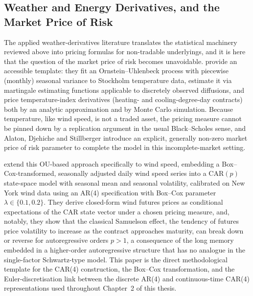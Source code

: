 \documentclass[11pt, a4paper, twoside]{article}
\begin{document}
\subsection{Weather and Energy Derivatives, and the Market Price of Risk}
\label{sec:lit-derivatives}

The applied weather-derivatives literature translates the statistical machinery reviewed above into pricing formulas for non-tradable underlyings, and it is here that the question of the market price of risk becomes unavoidable. \citet{AlatonEtAl2002} provide an accessible template: they fit an Ornstein--Uhlenbeck process with piecewise (monthly) seasonal variance to Stockholm temperature data, estimate it via martingale estimating functions applicable to discretely observed diffusions, and price temperature-index derivatives (heating- and cooling-degree-day contracts) both by an analytic approximation and by Monte Carlo simulation. Because temperature, like wind speed, is not a traded asset, the pricing measure cannot be pinned down by a replication argument in the usual Black--Scholes sense, and Alaton, Djehiche and Stillberger introduce an explicit, generally non-zero market price of risk parameter to complete the model in this incomplete-market setting.

\citet{BenthSaltyteBenth2009} extend this OU-based approach specifically to wind speed, embedding a Box--Cox-transformed, seasonally adjusted daily wind speed series into a CAR$(p)$ state-space model with seasonal mean and seasonal volatility, calibrated on New York wind data using an AR(4) specification with Box--Cox parameter $\lambda \in \{0.1, 0.2\}$. They derive closed-form wind futures prices as conditional expectations of the CAR state vector under a chosen pricing measure, and, notably, they show that the classical Samuelson effect, the tendency of futures price volatility to increase as the contract approaches maturity, can break down or reverse for autoregressive orders $p > 1$, a consequence of the long memory embedded in a higher-order autoregressive structure that has no analogue in the single-factor Schwartz-type model. This paper is the direct methodological template for the CAR(4) construction, the Box--Cox transformation, and the Euler-discretisation link between the discrete AR(4) and continuous-time CAR(4) representations used throughout Chapter~2 of this thesis.
\end{document}
